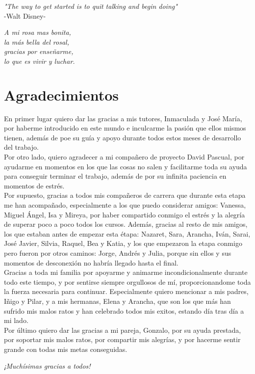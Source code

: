 {
	\vspace*{1cm}
	\begin{flushright}
		\textit{"The way to get started is to quit talking and begin doing"}\\
		\vspace{10pt}
		-Walt Disney-
	\end{flushright}
	
	\vspace*{14cm}
	\begin{flushright}
		\textit{A mi rosa mas bonita,\\
		la más bella del rosal,\\
		gracias por enseñarme,\\
		lo que es vivir y luchar.}
	\end{flushright}
}

\chapter*{Agradecimientos}

En primer lugar quiero dar las gracias a mis tutores, Inmaculada y José María, por haberme introducido en este mundo e inculcarme la pasión que ellos mismos tienen, además de poe su guía y apoyo durante todos estos meses de desarrollo del trabajo.\\
 
Por otro lado, quiero agradecer a mi compañero de proyecto David Pascual, por ayudarme en momentos en los que las cosas no salen y facilitarme toda su ayuda para conseguir terminar el trabajo, además de por su infinita paciencia en momentos de estrés.\\

Por supuesto, gracias a todos mis compañeros de carrera que durante esta etapa me han acompañado, especialmente a los que puedo considerar amigos: Vanessa, Miguel Ángel, Isa y Mireya, por haber compartido conmigo el estrés y la alegría de superar poco a poco todos los cursos. Además, gracias al resto de mis amigos, los que estaban antes de empezar esta étapa: Nazaret, Sara, Arancha, Iván, Sarai, José Javier, Silvia, Raquel, Bea y Katia, y los que empezaron la etapa conmigo pero fueron por otros caminos: Jorge, Andrés y Julia, porque sin ellos y sus momentos de desconexión no habría llegado hasta el final.\\

Gracias a toda mi familia por apoyarme y animarme incondicionalmente durante todo este tiempo, y por sentirse siempre orgullosos de mí, proporcionandome toda la fuerza necesaria para continuar. Especialmente quiero mencionar a mis padres, Iñigo y Pilar, y a mis hermanas, Elena y Arancha, que son los que más han sufrido mis malos ratos y han celebrado todos mis exitos, estando día tras día a mi lado.\\

Por último quiero dar las gracias a mi pareja, Gonzalo, por su ayuda prestada, por soportar mis malos ratos, por compartir mis alegrías, y por hacerme sentir grande con todas mis metas conseguidas.\\

\begin{flushright}
	\emph{¡Muchí­simas gracias a todos!}
\end{flushright}